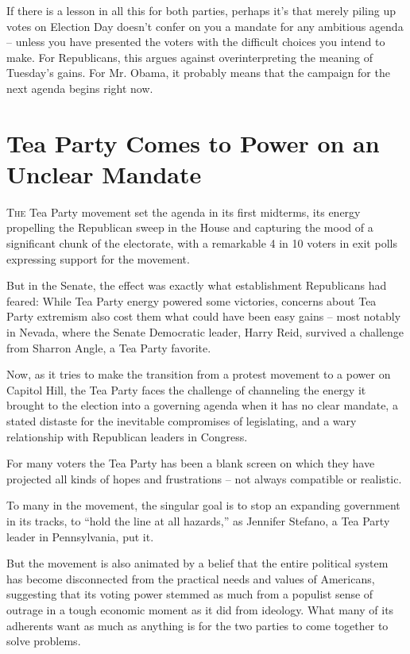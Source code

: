 ﻿\documentclass[12pt]{article}
\begin{document}
If there is a lesson in all this for both parties, perhaps it's that merely piling up votes on
Election Day doesn't confer on you a mandate for any ambitious agenda -- unless you have presented
the voters with the difficult choices you intend to make. For Republicans, this argues against
overinterpreting the meaning of Tuesday's gains. For Mr. Obama, it probably means that the campaign
for the next agenda begins right now.

\section{Tea Party Comes to Power on an Unclear Mandate}

\lettrine{T}{he} Tea Party movement set the agenda in its first midterms,
its energy propelling the Republican sweep in the House and capturing the mood of a significant
chunk of the electorate, with a remarkable 4 in 10 voters in exit polls expressing support for the
movement.

But in the Senate, the effect was exactly what establishment Republicans had feared: While Tea Party
energy powered some victories, concerns about Tea Party extremism also cost them what could have
been easy gains -- most notably in Nevada, where the Senate Democratic leader, Harry Reid, survived
a challenge from Sharron Angle, a Tea Party favorite.

Now, as it tries to make the transition from a protest movement to a power on Capitol Hill, the Tea
Party faces the challenge of channeling the energy it brought to the election into a governing
agenda when it has no clear mandate, a stated distaste for the inevitable compromises of
legislating, and a wary relationship with Republican leaders in Congress.

For many voters the Tea Party has been a blank screen on which they have projected all kinds of
hopes and frustrations -- not always compatible or realistic.

To many in the movement, the singular goal is to stop an expanding government in its tracks, to
``hold the line at all hazards,'' as Jennifer Stefano, a Tea Party leader in Pennsylvania, put it.

But the movement is also animated by a belief that the entire political system has become
disconnected from the practical needs and values of Americans, suggesting that its voting power
stemmed as much from a populist sense of outrage in a tough economic moment as it did from ideology.
What many of its adherents want as much as anything is for the two parties to come together to solve
problems.
\end{document}
